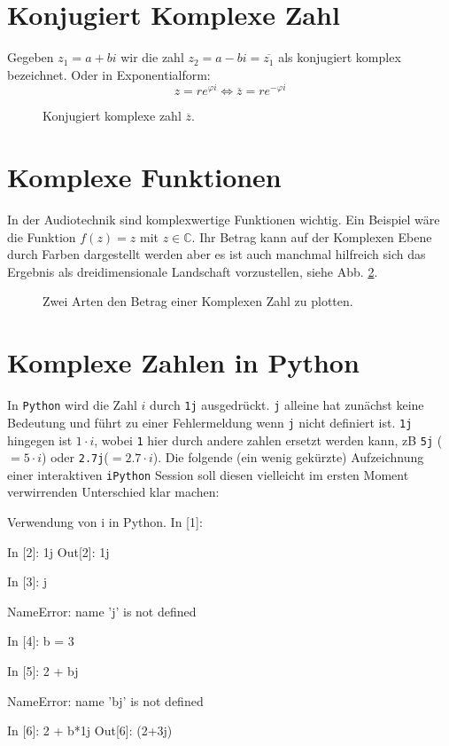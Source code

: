 \section{Konjugiert Komplexe Zahl}
Gegeben $z_1 = a + bi$ wir die zahl $z_2 = a - bi = \overline{z_1}$ als konjugiert komplex bezeichnet. Oder in Exponentialform:
$$z = re^{\varphi i} \iff \overline{z} = re^{-\varphi i}$$

\begin{figure}[h]
	\centering
	
	\caption{Konjugiert komplexe zahl $\overline{z}$.}
	\label{fig:komp_conju}
\end{figure}


\section{Komplexe Funktionen}
In der Audiotechnik sind komplexwertige Funktionen wichtig. Ein Beispiel wäre die Funktion $f(z) = z$ mit $z \in \mathbb{C}$. Ihr Betrag kann auf der Komplexen Ebene durch Farben dargestellt werden aber es ist auch manchmal hilfreich sich das Ergebnis als dreidimensionale Landschaft vorzustellen, siehe Abb. \ref{fig:komp_3D}. 

\begin{figure}[h]
	\centering
	
	\caption{Zwei Arten den Betrag einer Komplexen Zahl zu plotten.}
	\label{fig:komp_3D}
\end{figure}


\section{Komplexe Zahlen in Python}

In \texttt{Python} wird die Zahl $i$ durch \texttt{1j} ausgedrückt. \texttt{j} alleine hat zunächst keine Bedeutung und führt zu einer Fehlermeldung wenn \texttt{j} nicht definiert ist. \texttt{1j} hingegen ist $1\cdot i$, wobei \texttt{1} hier durch andere zahlen ersetzt werden kann, zB \texttt{5j} ($=5\cdot i$) oder \texttt{2.7j}($=2.7 \cdot i$). Die folgende (ein wenig gekürzte) Aufzeichnung einer interaktiven \texttt{iPython} Session soll diesen vielleicht im ersten Moment verwirrenden Unterschied klar machen:

\begin{python}{Verwendung von i in Python.}
In [1]: %

In [2]: 1j
Out[2]: 1j

In [3]: j

NameError: name 'j' is not defined

In [4]: b = 3

In [5]: 2 + bj

NameError: name 'bj' is not defined

In [6]: 2 + b*1j
Out[6]: (2+3j)
\end{python}



